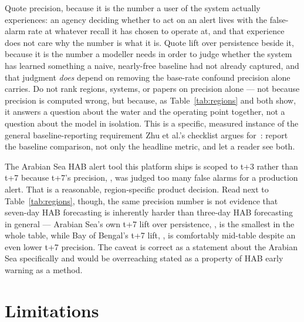  Quote precision, because it is the number a
user of the system actually experiences: an agency deciding whether to act
on an alert lives with the false-alarm rate at whatever recall it has chosen
to operate at, and that experience does not care why the number is what it
is. Quote lift over persistence beside it, because it is the number a
modeller needs in order to judge whether the system has learned something a
naive, nearly-free baseline had not already captured, and that judgment
\emph{does} depend on removing the base-rate confound precision alone
carries. Do not rank regions, systems, or papers on precision alone --- not
because precision is computed wrong, but because, as
Table~\ref{tab:regions} and \citep{davis2006} both show, it answers a
question about the water and the operating point together, not a question
about the model in isolation. This is a specific, measured instance of the
general baseline-reporting requirement Zhu et al.'s checklist
argues for~\citep{embrace2024}: report the baseline comparison, not only the
headline metric, and let a reader see both.

 The Arabian
Sea HAB alert tool this platform ships is scoped to t+3 rather than t+7
because t+7's precision, \HabArabianPrecSeven{}, was judged too many false
alarms for a production alert. That is a reasonable, region-specific product
decision. Read next to Table~\ref{tab:regions}, though, the same precision
number is not evidence that seven-day HAB forecasting is inherently harder
than three-day HAB forecasting in general --- Arabian Sea's own t+7 lift
over persistence, \HabArabianLiftSeven{}, is the smallest in the whole
table, while Bay of Bengal's t+7 lift, \HabBengalLiftSeven{}, is
comfortably mid-table despite an even lower t+7 precision. The caveat is
correct as a statement about the Arabian Sea specifically and would be
overreaching stated as a property of HAB early warning as a method.

\section{Limitations}
\label{sec:limitations}


